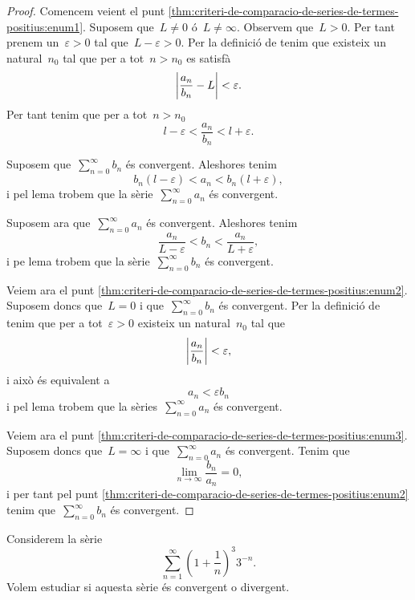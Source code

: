 \documentclass[../analisi-matematica.tex]{subfiles}
\begin{document}
    \begin{proof}
        Comencem veient el punt \eqref{thm:criteri-de-comparacio-de-series-de-termes-positius:enum1}.
        Suposem que~\(L\neq0\) ó~\(L\neq\infty\).
        Observem que~\(L>0\).
        Per tant prenem un~\(\varepsilon>0\) tal que~\(L-\varepsilon>0\).
        Per la definició de  tenim que existeix un natural~\(n_{0}\) tal que per a tot~\(n>n_{0}\) es satisfà
        \[
            \abs{\frac{a_{n}}{b_{n}}-L}<\varepsilon.
        \]
        Per tant tenim que per a tot~\(n>n_{0}\)
        \[
            l-\varepsilon<\frac{a_{n}}{b_{n}}<l+\varepsilon.
        \]

        Suposem que~\(\sum_{n=0}^{\infty}b_{n}\) és convergent.
        Aleshores tenim
        \[
            b_{n}(l-\varepsilon)<a_{n}<b_{n}(l+\varepsilon),
        \]
        i pel lema  trobem que la sèrie~\(\sum_{n=0}^{\infty}a_{n}\) és convergent.

        Suposem ara que~\(\sum_{n=0}^{\infty}a_{n}\) és convergent.
        Aleshores tenim
        \[
            \frac{a_{n}}{L-\varepsilon}<b_{n}<\frac{a_{n}}{L+\varepsilon},
        \]
        i pe lema  trobem que la sèrie~\(\sum_{n=0}^{\infty}b_{n}\) és convergent.

        Veiem ara el punt \eqref{thm:criteri-de-comparacio-de-series-de-termes-positius:enum2}.
        Suposem doncs que~\(L=0\) i que~\(\sum_{n=0}^{\infty}b_{n}\) és convergent.
        Per la definició de  tenim que per a tot~\(\varepsilon>0\) existeix un natural~\(n_{0}\) tal que
        \[
            \abs{\frac{a_{n}}{b_{n}}}<\varepsilon,
        \]
        i això és equivalent a
        \[
            a_{n}<\varepsilon b_{n}
        \]
        i pel lema  trobem que la sèries~\(\sum_{n=0}^{\infty}a_{n}\) és convergent.

        Veiem ara el punt \eqref{thm:criteri-de-comparacio-de-series-de-termes-positius:enum3}.
        Suposem doncs que~\(L=\infty\) i que~\(\sum_{n=0}^{\infty}a_{n}\) és convergent.
        Tenim que
        \[
            \lim_{n\to\infty}\frac{b_{n}}{a_{n}}=0,
        \] %
        i per tant pel punt \eqref{thm:criteri-de-comparacio-de-series-de-termes-positius:enum2} tenim que~\(\sum_{n=0}^{\infty}b_{n}\) és convergent.
    \end{proof}
    \begin{example}
        Considerem la sèrie
        \[
            \sum_{n=1}^{\infty}\left(1+\frac{1}{n}\right)^{3}3^{-n}.
        \]
        Volem estudiar si aquesta sèrie és convergent o divergent.
    \end{example}
\end{document}
